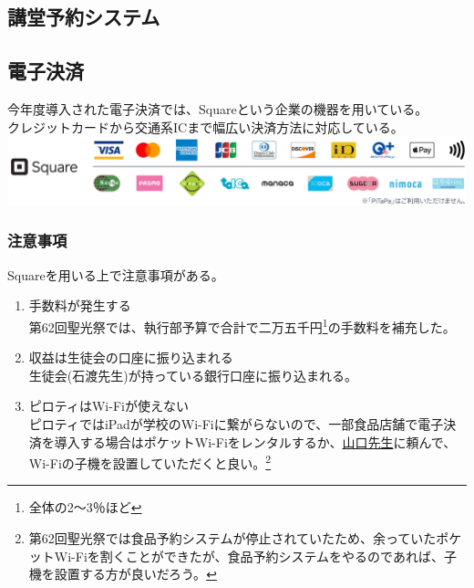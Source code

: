 \documentclass[dvipdfmx,jb5]{jarticle}
\newcommand{\mail}[2]{\href{#2}{#1}}
\begin{document}
 \subsection{講堂予約システム}
 \subsection{電子決済}
 今年度導入された電子決済では、Squareという企業の機器を用いている。\\
 クレジットカードから交通系ICまで幅広い決済方法に対応している。\\
 \includegraphics[scale=0.15]{assets/square_availability.png}
 \subsubsection{注意事項}
 Squareを用いる上で注意事項がある。
 \begin{enumerate}[注意1]
  \item 手数料が発生する\\
  第62回聖光祭では、執行部予算で合計で二万五千円\footnote{全体の2〜3％ほど}の手数料を補充した。
  \item 収益は生徒会の口座に振り込まれる\\
  生徒会(石渡先生)が持っている銀行口座に振り込まれる。
  \item ピロティはWi-Fiが使えない\\
  ピロティではiPadが学校のWi-Fiに繋がらないので、一部食品店舗で電子決済を導入する場合はポケットWi-Fiをレンタルするか、\mail{山口先生}{yuri.ayamguchi@seiko.ac.jp}に頼んで、Wi-Fiの子機を設置していただくと良い。\footnote{第62回聖光祭では食品予約システムが停止されていたため、余っていたポケットWi-Fiを割くことができたが、食品予約システムをやるのであれば、子機を設置する方が良いだろう。}
 \end{enumerate}
\end{document}
